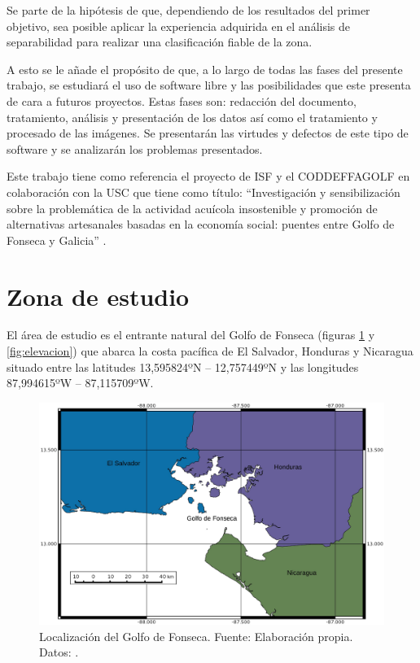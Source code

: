 Se parte de la hipótesis de que, dependiendo de los resultados del primer objetivo, sea posible aplicar la experiencia adquirida en el análisis de separabilidad para realizar una clasificación fiable de la zona.\Sep

A esto se le añade el propósito de que, a lo largo de todas las fases del presente trabajo, se estudiará el uso de software libre y las posibilidades que este presenta de cara a futuros proyectos. Estas fases son: redacción del documento, tratamiento, análisis y presentación de los datos así como el tratamiento y procesado de las imágenes. Se presentarán las virtudes y defectos de este tipo de software y se analizarán los problemas presentados.\Sep

Este trabajo tiene como referencia el proyecto de \ac{ISF} y el \ac{CODDEFFAGOLF} en colaboración con la \ac{USC} que tiene como título: ``Investigación y sensibilización sobre la problemática de la actividad acuícola insostenible y promoción de alternativas artesanales basadas en la economía social: puentes entre Golfo de Fonseca y Galicia'' \citep{laborate2014}.

\section{Zona de estudio}\label{sec:zonaestudio}
El área de estudio es el entrante natural del Golfo de Fonseca (figuras \ref{fig:localizacion} y \ref{fig:elevacion}) que abarca la costa pacífica de El Salvador, Honduras y Nicaragua situado entre las latitudes 13,595824ºN – 12,757449ºN y las longitudes 87,994615ºW – 87,115709ºW.\Sep

\begin{figure}
	\centering
	\includegraphics[width=0.8\linewidth]{./Imagenes/localizacion.eps}
	\caption[Localización del Golfo de Fonseca]{Localización del Golfo de Fonseca. Fuente: Elaboración propia. Datos: \cite{GADM2012}.}
	\label{fig:localizacion}
\end{figure}

